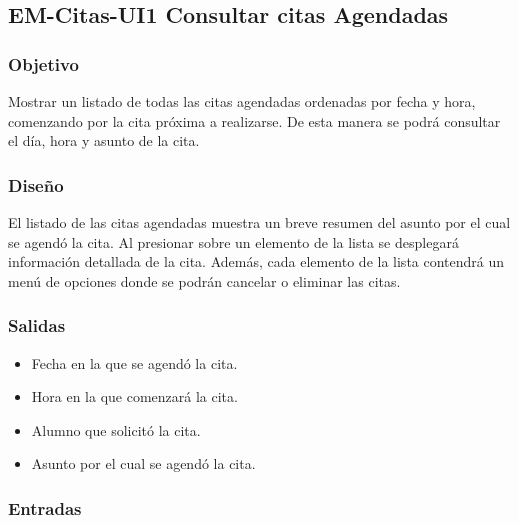 

\pagebreak
\subsection{EM-Citas-UI1 Consultar citas Agendadas}

\subsubsection{Objetivo}
	\noindent
	Mostrar un listado de todas las citas agendadas ordenadas por fecha y hora, comenzando por la cita
	próxima a realizarse. De esta manera se podrá consultar el día, hora y asunto de la cita.

\subsubsection{Diseño}
	\noindent
	El listado de las citas agendadas muestra un breve resumen del asunto por el cual se agendó la cita.
	Al presionar sobre un elemento de la lista se desplegará información detallada de 
	la cita. Además, cada elemento de la lista contendrá un menú de opciones donde se podrán cancelar
	o eliminar las citas.


\subsubsection{Salidas}
	\begin{itemize}
		\item Fecha en la que se agendó la cita.
		\item Hora en la que comenzará la cita.
			\item Alumno que solicitó la cita.
		\item Asunto por el cual se agendó la cita.
	\end{itemize}

\subsubsection{Entradas}

